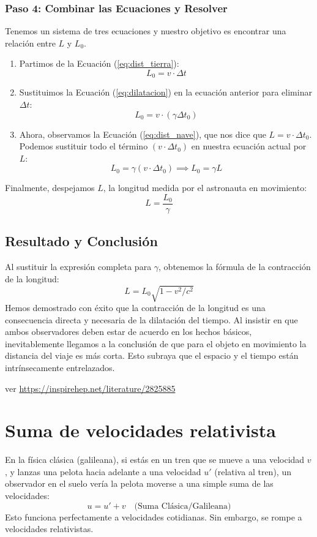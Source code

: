 \documentclass[11pt,a4paper]{article}
\begin{document}
\subsubsection*{Paso 4: Combinar las Ecuaciones y Resolver}
Tenemos un sistema de tres ecuaciones y nuestro objetivo es encontrar una relación entre $L$ y $L_0$.
\begin{enumerate}
    \item Partimos de la Ecuación (\ref{eq:dist_tierra}):
    \[ L_0 = v \cdot \Delta t \]
    \item Sustituimos la Ecuación (\ref{eq:dilatacion}) en la ecuación anterior para eliminar $\Delta t$:
    \[ L_0 = v \cdot (\gamma \Delta t_0) \]
    \item Ahora, observamos la Ecuación (\ref{eq:dist_nave}), que nos dice que $L = v \cdot \Delta t_0$. Podemos sustituir todo el término $(v \cdot \Delta t_0)$ en nuestra ecuación actual por $L$:
    \[ L_0 = \gamma (v \cdot \Delta t_0) \implies L_0 = \gamma L \]
\end{enumerate}
Finalmente, despejamos $L$, la longitud medida por el astronauta en movimiento:
\[ L = \frac{L_0}{\gamma} \]

\subsection*{Resultado y Conclusión}
Al sustituir la expresión completa para $\gamma$, obtenemos la fórmula de la contracción de la longitud:
\[ \boxed{ L = L_0 \sqrt{1 - v^2/c^2} } \]
Hemos demostrado con éxito que la contracción de la longitud es una consecuencia directa y necesaria de la dilatación del tiempo. Al insistir en que ambos observadores deben estar de acuerdo en los hechos básicos, inevitablemente llegamos a la conclusión de que para el objeto en movimiento la distancia del viaje es más corta. Esto subraya que el espacio y el tiempo están intrínsecamente entrelazados.


ver \url{https://inspirehep.net/literature/2825885}


\section{Suma de velocidades relativista}

En la física clásica (galileana), si estás en un tren que se mueve a una velocidad $v$, y lanzas una pelota hacia adelante a una velocidad $u'$ (relativa al tren), un observador en el suelo vería la pelota moverse a una simple suma de las velocidades:
\[ u = u' + v \quad \text{(Suma Clásica/Galileana)} \]
Esto funciona perfectamente a velocidades cotidianas. Sin embargo, se rompe a velocidades relativistas.
\end{document}
